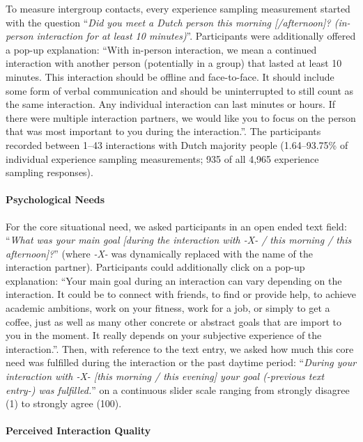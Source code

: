 To measure intergroup contacts, every experience sampling measurement
started with the question
``\textit{Did you meet a Dutch person this morning [/afternoon]? (in-person interaction for at least 10 minutes)}''.
Participants were additionally offered a pop-up explanation: ``With
in-person interaction, we mean a continued interaction with another
person (potentially in a group) that lasted at least 10 minutes. This
interaction should be offline and face-to-face. It should include some
form of verbal communication and should be uninterrupted to still count
as the same interaction. Any individual interaction can last minutes or
hours. If there were multiple interaction partners, we would like you to
focus on the person that was most important to you during the
interaction.''. The participants recorded between 1--43 interactions
with Dutch majority people (1.64--93.75\% of individual experience
sampling measurements; 935 of all 4,965 experience sampling responses).

\paragraph{Psychological Needs}

For the core situational need, we asked participants in an open ended
text field:
``\textit{What was your main goal [during the interaction with -X- / this morning / this afternoon]?}''
(where \textit{-X-} was dynamically replaced with the name of the
interaction partner). Participants could additionally click on a pop-up
explanation: ``Your main goal during an interaction can vary depending
on the interaction. It could be to connect with friends, to find or
provide help, to achieve academic ambitions, work on your fitness, work
for a job, or simply to get a coffee, just as well as many other
concrete or abstract goals that are import to you in the moment. It
really depends on your subjective experience of the interaction.''.
Then, with reference to the text entry, we asked how much this core need
was fulfilled during the interaction or the past daytime period:
``\textit{During your interaction with -X- [this morning / this evening] your goal (-previous text entry-) was fulfilled.}''
on a continuous slider scale ranging from strongly disagree (1) to
strongly agree (100).

\paragraph{Perceived Interaction Quality}

